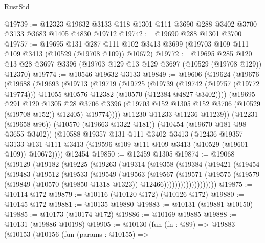 \begin{lexlean}{RustStd}
\begin{coremodule}
@19739 := @12323 @19632 @3133 @118 @1301 @111 @3690 @288 @3402 @3700 @3133 @3683 @1405 @4830 @19712
@19742 := @19690 @288 @1301 @3700
@19757 := @19695
    @131
    @287
    @111
    @102
    @3413
    @3699
    (@19703 @109 @111 @109 @3413 (@10529 (@19708 @109)) @10672)
@19772 := @19695
    @285
    @120
    @13
    @28
    @3697
    @3396
    (@19703 @129 @13 @129 @3697 (@10529 (@19708 @129)) @12370)
@19774 := @10546 @19632 @3133
@19849 := @19606
    (@19624
      (@19676
        (@19688
          (@19693
            (@19713
              (@19719
                (@19725
                  (@19739
                    (@19742 (@19757 (@19772 @19774)))
                    @11055
                    @10576
                    @12382
                    (@10570 (@12384 @4827 @3402))))
                (@19695
                  @291
                  @120
                  @1305
                  @28
                  @3706
                  @3396
                  (@19703 @152 @1305 @152 @3706 (@10529 (@19708 @152)) @12405)
                  @19774))))
          @11230
          @11233
          @11236
          @11239))
      (@12231 (@19658 @96))
      (@10570 (@19663 @1322 @181))
      (@10454 (@19670 @181 @98 @3655 @3402))
      (@10588
        @19357
        @131
        @111
        @3402
        @3413
        (@12436
          @19357
          @3133
          @131
          @111
          @3413
          (@19596 @109 @111 @109 @3413 (@10529 (@19601 @109)) @10672))))
    @12454
@19850 := @12459 @1305
@19874 := @19068
    (@19129
      (@19182
        (@19225
          (@19263
            (@19314
              (@19358
                (@19384
                  (@19421
                    (@19454
                      (@19483
                        (@19512
                          (@19533
                            (@19549
                              (@19563
                                (@19567
                                  (@19571
                                    (@19575
                                      (@19579
                                        (@19849
                                          (@10570 (@19850 @1318 @1323))
                                          @12466)))))))))))))))))))
@19875 := @10114 @172
@19879 := @10116 (@10120 @172) (@10126 @172)
@19880 := @10145 @172
@19881 := @10135 @19880
@19883 := @10131 (@19881 @10150)
@19885 := @10173 (@10174 @172)
@19886 := @10169 @19885
@19888 := @10131 (@19886 @10198)
@19905 := @10130
    (fun (fn : @89) =>
    @19883
      (@10153
        (@10156
          (fun (params : @10155) =>

\end{coremodule}
\end{lexlean}
